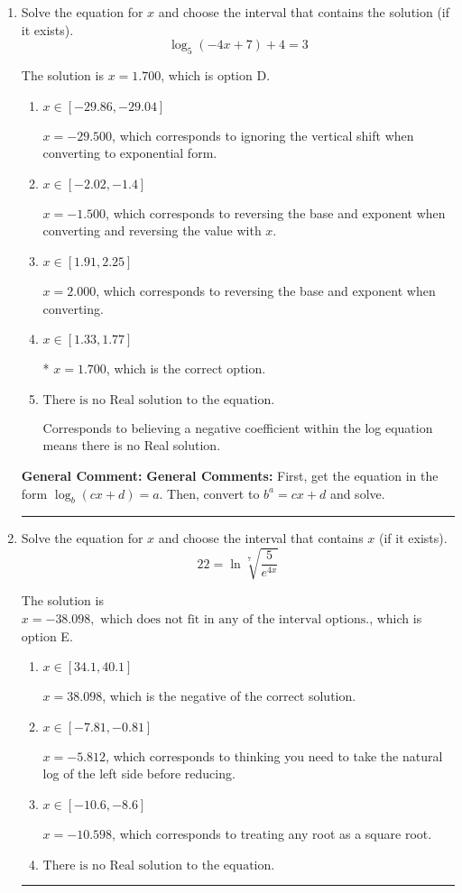 \documentclass{extbook}[14pt]
\newcommand{\litem}[1]{\item #1

\rule{\textwidth}{0.4pt}}
\begin{document}
\begin{enumerate}\litem{
Solve the equation for $x$ and choose the interval that contains the solution (if it exists).
\[ \log_{5}{(-4x+7)}+4 = 3 \]

The solution is \( x = 1.700 \), which is option D.\begin{enumerate}[label=\Alph*.]
\item \( x \in [-29.86, -29.04] \)

$x = -29.500$, which corresponds to ignoring the vertical shift when converting to exponential form.
\item \( x \in [-2.02, -1.4] \)

$x = -1.500$, which corresponds to reversing the base and exponent when converting and reversing the value with $x$.
\item \( x \in [1.91, 2.25] \)

$x = 2.000$, which corresponds to reversing the base and exponent when converting.
\item \( x \in [1.33, 1.77] \)

* $x = 1.700$, which is the correct option.
\item \( \text{There is no Real solution to the equation.} \)

Corresponds to believing a negative coefficient within the log equation means there is no Real solution.
\end{enumerate}

\textbf{General Comment:} \textbf{General Comments:} First, get the equation in the form $\log_b{(cx+d)} = a$. Then, convert to $b^a = cx+d$ and solve.
}
\litem{
 Solve the equation for $x$ and choose the interval that contains $x$ (if it exists).
\[  22 = \ln{\sqrt[7]{\frac{5}{e^{4x}}}} \]

The solution is \( x = -38.098, \text{ which does not fit in any of the interval options.} \), which is option E.\begin{enumerate}[label=\Alph*.]
\item \( x \in [34.1, 40.1] \)

$x = 38.098$, which is the negative of the correct solution.
\item \( x \in [-7.81, -0.81] \)

$x = -5.812$, which corresponds to thinking you need to take the natural log of the left side before reducing.
\item \( x \in [-10.6, -8.6] \)

$x = -10.598$, which corresponds to treating any root as a square root.
\item \( \text{There is no Real solution to the equation.} \)


\end{enumerate}}
\end{enumerate}
\end{document}
